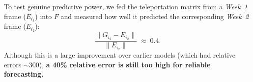 \documentclass[11pt]{article}
\begin{document}
\vspace{0.4em}

\begin{evidencebox}[title={Observation 2 — Cross-week prediction}]
To test genuine predictive power, we fed the teleportation matrix from a
\emph{Week~1} frame ($E_{i_1}$) into $F$ and measured how well it
predicted the corresponding \emph{Week~2} frame ($E_{i_2}$):
\[
  \frac{\lVert G_{i_2} - E_{i_2}\rVert}{\lVert E_{i_2}\rVert}
  \;\approx\; 0.4.
\]
Although this is a large improvement over earlier models (which had relative errors $\sim\!300$), \textbf{a 40\% relative error is still too high for reliable forecasting.}
\end{evidencebox}

\end{document}
